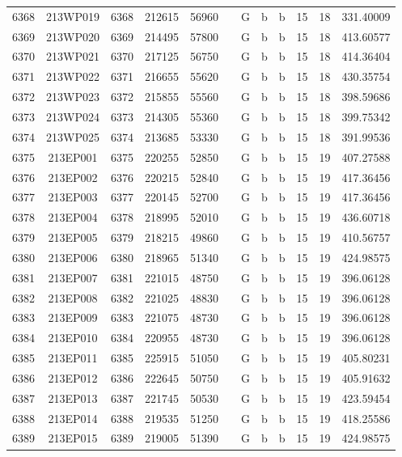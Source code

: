 \begin{tabular}{|*{12}{c|}}
6368 & 213WP019 & 6368 & 212615 & 56960 &  & G & b & b & 15 & 18 & 331.40009 \\ 
6369 & 213WP020 & 6369 & 214495 & 57800 &  & G & b & b & 15 & 18 & 413.60577 \\ 
6370 & 213WP021 & 6370 & 217125 & 56750 &  & G & b & b & 15 & 18 & 414.36404 \\ 
6371 & 213WP022 & 6371 & 216655 & 55620 &  & G & b & b & 15 & 18 & 430.35754 \\ 
6372 & 213WP023 & 6372 & 215855 & 55560 &  & G & b & b & 15 & 18 & 398.59686 \\ 
6373 & 213WP024 & 6373 & 214305 & 55360 &  & G & b & b & 15 & 18 & 399.75342 \\ 
6374 & 213WP025 & 6374 & 213685 & 53330 &  & G & b & b & 15 & 18 & 391.99536 \\ 
6375 & 213EP001 & 6375 & 220255 & 52850 &  & G & b & b & 15 & 19 & 407.27588 \\ 
6376 & 213EP002 & 6376 & 220215 & 52840 &  & G & b & b & 15 & 19 & 417.36456 \\ 
6377 & 213EP003 & 6377 & 220145 & 52700 &  & G & b & b & 15 & 19 & 417.36456 \\ 
6378 & 213EP004 & 6378 & 218995 & 52010 &  & G & b & b & 15 & 19 & 436.60718 \\ 
6379 & 213EP005 & 6379 & 218215 & 49860 &  & G & b & b & 15 & 19 & 410.56757 \\ 
6380 & 213EP006 & 6380 & 218965 & 51340 &  & G & b & b & 15 & 19 & 424.98575 \\ 
6381 & 213EP007 & 6381 & 221015 & 48750 &  & G & b & b & 15 & 19 & 396.06128 \\ 
6382 & 213EP008 & 6382 & 221025 & 48830 &  & G & b & b & 15 & 19 & 396.06128 \\ 
6383 & 213EP009 & 6383 & 221075 & 48730 &  & G & b & b & 15 & 19 & 396.06128 \\ 
6384 & 213EP010 & 6384 & 220955 & 48730 &  & G & b & b & 15 & 19 & 396.06128 \\ 
6385 & 213EP011 & 6385 & 225915 & 51050 &  & G & b & b & 15 & 19 & 405.80231 \\ 
6386 & 213EP012 & 6386 & 222645 & 50750 &  & G & b & b & 15 & 19 & 405.91632 \\ 
6387 & 213EP013 & 6387 & 221745 & 50530 &  & G & b & b & 15 & 19 & 423.59454 \\ 
6388 & 213EP014 & 6388 & 219535 & 51250 &  & G & b & b & 15 & 19 & 418.25586 \\ 
6389 & 213EP015 & 6389 & 219005 & 51390 &  & G & b & b & 15 & 19 & 424.98575 \\ 

\end{tabular}
